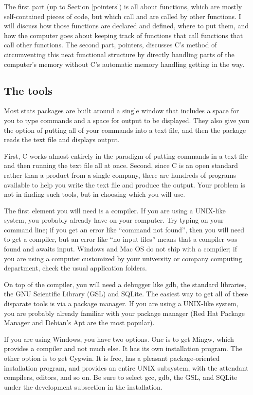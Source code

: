 \documentclass[12pt]{article}
\makeatletter
\def\ttind#1{\index{#1@\cinline{#1}}\cinline{#1}}
\makeatother
\begin{document}
The first part (up to Section \ref{pointers})
is all about functions, which are mostly self-contained pieces of code,
but which call and are called by other functions. I will discuss how
those functions are declared and defined, where to put them, and how the
computer goes about keeping track of functions that call functions that
call other functions. The second part, pointers, discusses C's method
of circumventing this neat functional structure by directly handling
parts of the computer's memory without C's automatic memory handling
getting in the way.

\subsection{The tools} 
Most stats packages are built around a single window that includes a
space for you to type commands and a space for output to be displayed.
They also give you the option of putting all of your commands into a
text file, and then the package reads the text file and displays output.

First, C works almost entirely in the paradigm of putting commands in a
text file and then running the text file all at once. Second, since
C is an open standard rather than a product from a single company, there
are hundreds of programs available to help you write the text file and
produce the output. Your problem is not in finding such tools, but in
choosing which you will use.

The first element you will need is a compiler. If you are using
a UNIX-like system, you probably already have \ttind{gcc} on your
computer. Try typing  on your command line; if you get an
error like ``command not found'', then you will need to get a compiler,
but an error like ``no input files'' means that a compiler was found
and awaits input. Windows and Mac OS do not ship with a compiler; if you
are using a computer customized by your university or company computing
department, check the usual application folders.

On top of the compiler, you will need a debugger like gdb, the standard
libraries, the GNU Scientific Library (GSL) and SQLite.  The easiest
way to get all of these disparate tools is via a package manager. If
you are using a UNIX-like system, you are probably already familiar with
your package manager (Red Hat Package Manager and Debian's Apt are the
most popular).

If you are using Windows, you have two options. One is to get
Mingw, which provides a compiler and not much else. It has its
own installation program. The other option is to get Cygwin.
It is free, has a pleasant package-oriented
installation program, and provides an entire UNIX subsystem, with the
attendant compilers, editors, and so on. Be sure to select gcc, gdb,
the GSL, and SQLite under the development subsection in the installation.
\end{document}
